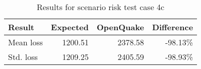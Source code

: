 \begin{table}[htbp]

\centering
\begin{tabular}{ l r r r }

\hline
\rowcolor{anti-flashwhite}
\bf{Result} & \bf{Expected} & \bf{OpenQuake} & \bf{Difference}\\
\hline
Mean loss & 1200.51 & 2378.58 & -98.13\% \\
Std. loss & 1209.25 & 2405.59 & -98.93\% \\
\hline
\end{tabular}

\caption{Results for scenario risk test case 4c}
\label{tab:result-scenario-risk-4c}
\end{table}